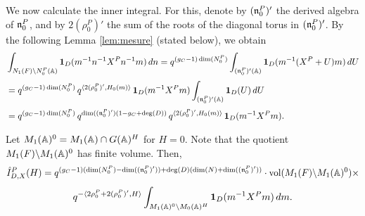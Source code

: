 \begin{paragr}
\begin{preuve}
We now calculate the inner integral. For this, denote by $(\mathfrak{n}_0^P)'$ the derived algebra of $\mathfrak{n}_0^P$, and by $2(\rho_0^P)'$ the sum of the roots of the diagonal torus in $(\mathfrak{n}_0^P)'$. By the following Lemma \ref{lem:mesure} (stated below), we obtain
\begin{eqnarray*}
& \displaystyle \int_{N_1(F)\backslash N_0^P(\mathbb{A})}  \mathbf{1}_{D}(m^{-1} n^{-1}X^P n^{-1}m) \, dn = q^{ (g_C-1)\dim(N_0^P)}\displaystyle \int_{(\mathfrak{n}_0^P)'(\mathbb{A})}\mathbf{1}_{D}(m^{-1} (X^P+U) m)\, dU\\[1mm]
&  = q^{ (g_C-1)\dim(N_0^P)}\, q^{\langle2 (\rho_0^P)',H_0(m)\rangle} \, \mathbf{1}_{D}(m^{-1}X^P m) \int_{(\mathfrak{n}_0^P)'(\mathbb{A})}\mathbf{1}_{D}(U)\, dU \\[1mm]
&=  q^{ (g_C-1)\dim(N_0^P)}\, q^{\dim((\mathfrak{n}_0^P)')(1-g_C+\deg(D))} \, q^{\langle2 (\rho_0^P)',H_0(m)\rangle} \, \mathbf{1}_{D}(m^{-1}X^P m).
\end{eqnarray*}

Let $M_1(\mathbb{A})^0=M_1(\mathbb{A})\cap G(\mathbb{A})^H$ for $H=0$. Note that the quotient $M_1(F)\backslash M_1(\mathbb{A})^0$ has finite volume. Then,
$$\hat{I}^P_{D,X}(H)  = q^{ (g_C-1)(\dim(N_0^P)-\dim((\mathfrak{n}_0^P)'))+\deg(D)(\dim(N)+\dim((\mathfrak{n}_0^P)'))}\cdot \operatorname{vol}(M_1(F)\backslash M_1(\mathbb{A})^0) \times$$
\begin{equation}
  \label{eq:lintegrale}
   q^{-\langle 2\rho_0^P+2(\rho_0^P)',H\rangle} \int_{M_1(\mathbb{A})^0\backslash M_0(\mathbb{A})^H} \mathbf{1}_{D}(m^{-1}X^P m)\, dm.
\end{equation}


\end{preuve}
\end{paragr}
